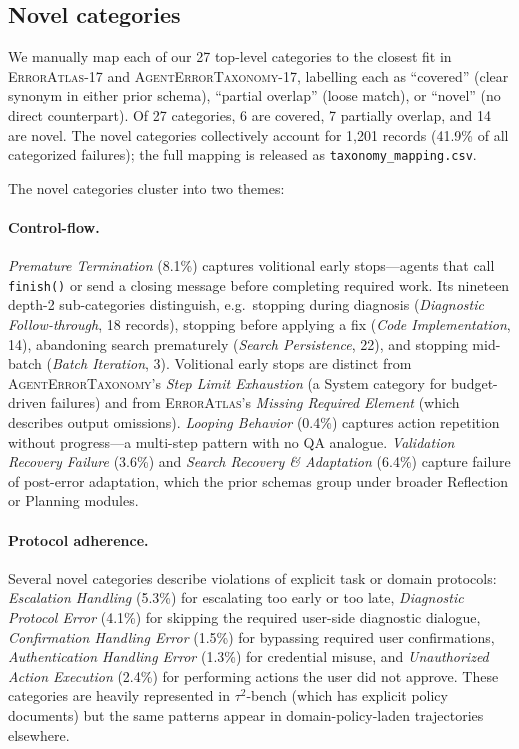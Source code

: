 \documentclass[11pt]{article}
\begin{document}
\subsection{Novel categories}

We manually map each of our 27 top-level categories to the closest
fit in \textsc{ErrorAtlas}-17 and \textsc{AgentErrorTaxonomy}-17,
labelling each as ``covered'' (clear synonym in either prior
schema), ``partial overlap'' (loose match), or ``novel'' (no
direct counterpart). Of 27 categories, 6 are covered, 7 partially
overlap, and 14 are novel. The novel categories collectively
account for 1{,}201 records (41.9\% of all categorized failures);
the full mapping is released as
\texttt{taxonomy\_mapping.csv}.

The novel categories cluster into two themes:

\paragraph{Control-flow.} \emph{Premature Termination} (8.1\%)
captures volitional early stops---agents that call \texttt{finish()}
or send a closing message before completing required work. Its
nineteen depth-2 sub-categories distinguish, e.g.\ stopping during
diagnosis (\emph{Diagnostic Follow-through}, 18 records), stopping
before applying a fix (\emph{Code Implementation}, 14), abandoning
search prematurely (\emph{Search Persistence}, 22), and stopping
mid-batch (\emph{Batch Iteration}, 3). Volitional early stops are
distinct from \textsc{AgentErrorTaxonomy}'s \emph{Step Limit
Exhaustion} (a System category for budget-driven failures) and from
\textsc{ErrorAtlas}'s \emph{Missing Required Element} (which
describes output omissions).
\emph{Looping Behavior} (0.4\%) captures action repetition without
progress---a multi-step pattern with no QA analogue.
\emph{Validation Recovery Failure} (3.6\%) and \emph{Search Recovery
\& Adaptation} (6.4\%) capture failure of post-error adaptation,
which the prior schemas group under broader Reflection or Planning
modules.

\paragraph{Protocol adherence.} Several novel categories describe
violations of explicit task or domain protocols:
\emph{Escalation Handling} (5.3\%) for escalating too early or too
late, \emph{Diagnostic Protocol Error} (4.1\%) for skipping the
required user-side diagnostic dialogue, \emph{Confirmation
Handling Error} (1.5\%) for bypassing required user confirmations,
\emph{Authentication Handling Error} (1.3\%) for credential
misuse, and \emph{Unauthorized Action Execution} (2.4\%) for
performing actions the user did not approve. These categories are
heavily represented in $\tau^2$-bench (which has explicit policy
documents) but the same patterns appear in domain-policy-laden
trajectories elsewhere.
\end{document}
